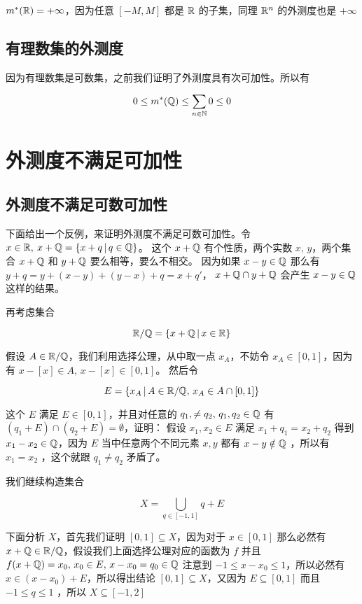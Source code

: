 $m^*(\mathbb{R}) = +\infty$，因为任意 $[-M, M]$ 都是 $\mathbb{R}$ 的子集，同理 $\mathbb{R}^n$ 的外测度也是 $+\infty$

\subsection{有理数集的外测度}

因为有理数集是可数集，之前我们证明了外测度具有次可加性。所以有

\[
0 \le m^*(\mathbb{Q}) \le \sum_{n \in \mathbb{N}} 0 \le 0
\]

\section{外测度不满足可加性}

\subsection{外测度不满足可数可加性}

下面给出一个反例，来证明外测度不满足可数可加性。令 $x \in \mathbb{R}, \: x + \mathbb{Q} = \{ x + q \,\vert\, q \in \mathbb{Q} \}$。
这个 $x + \mathbb{Q}$ 有个性质，两个实数 $x,\,y$，两个集合 $x + \mathbb{Q}$ 和 $y + \mathbb{Q}$ 要么相等，要么不相交。
因为如果 $x - y \in \mathbb{Q}$ 那么有 $ y + q = y + (x-y) + (y-x) + q = x + q'$， $x + \mathbb{Q} \cap y + \mathbb{Q}$ 会产生 $x -y \in \mathbb{Q}$ 这样的结果。

再考虑集合 

\[
\mathbb{R} / \mathbb{Q} = \{ x + \mathbb{Q} \,\vert\, x \in \mathbb{R} \}
\]

假设 $A \in \mathbb{R}/\mathbb{Q}$，我们利用选择公理，从中取一点 $x_A$，不妨令 $x_A \in [0,1]$，因为有 $x - [x] \in A, \, x - [x] \in [0,1]$。
然后令

\[
 E = \{ x_A \,\vert\, A \in \mathbb{R}/\mathbb{Q}, \, x_A \in A \cap [0,1] \}
\]

这个 $E$ 满足 $E \in [0,1]$，并且对任意的 $q_1, \ne q_2, \, q_1, q_2 \in \mathbb{Q}$ 有 $(q_1 + E) \cap (q_2 + E) = \emptyset$，证明：
假设 $x_1, x_2 \in E$ 满足 $x_1 + q_1 = x_2 + q_2$ 得到 $x_1 - x_2 \in \mathbb{Q}$，因为 $E$ 当中任意两个不同元素 $x,y$ 都有 $x-y \notin \mathbb{Q}$ ，所以有 $x_1 = x_2$ ，这个就跟 $q_1 \ne q_2$ 矛盾了。

我们继续构造集合

\[
X = \bigcup_{q \in [-1,1]} q + E
\]

下面分析 $X$，首先我们证明 $[0,1] \subseteq X$，因为对于 $x \in [0,1]$ 那么必然有 $x + \mathbb{Q} \in \mathbb{R}/\mathbb{Q}$，假设我们上面选择公理对应的函数为 $f$ 并且 $f(x + \mathbb{Q}) = x_0, \, x_0 \in E,\, x - x_0  = q_0 \in \mathbb{Q}$ 
注意到 $-1 \le x - x_0 \le 1$，所以必然有 $x \in (x - x_0) + E$，所以得出结论 $[0,1] \subseteq X$，又因为 $E \subseteq [0,1]$ 而且 $-1 \le q \le 1$ ，所以 $X \subseteq [-1, 2]$

